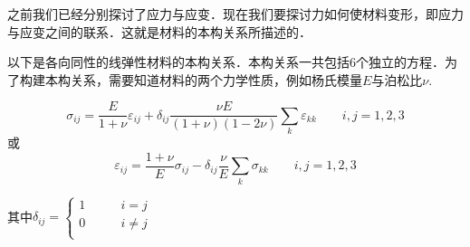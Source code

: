 
\begin{issues}
\issueDraft
\end{issues}

之前我们已经分别探讨了应力与应变．现在我们要探讨力如何使材料变形，即应力与应变之间的联系．这就是材料的本构关系所描述的．

以下是各向同性的线弹性材料的本构关系．本构关系一共包括$6$个独立的方程．为了构建本构关系，需要知道材料的两个力学性质，例如杨氏模量$E$与泊松比$\nu$.

\begin{equation}
\sigma_{ij}=\frac{E}{1+\nu}\varepsilon_{ij}+\delta_{ij}\frac{\nu E}{(1+\nu)(1-2\nu)}\sum_k\varepsilon_{kk}\qquad i,j=1,2,3
\end{equation}
或
\begin{equation}
\varepsilon_{ij}=\frac{1+\nu}{E}\sigma_{ij}-\delta_{ij}\frac{\nu}{E}\sum_k\sigma_{kk} \qquad i,j=1,2,3
\end{equation}

其中$\delta_{ij} = \left \{
\begin{aligned}
1 &\qquad i = j\\
0 &\qquad i \ne j\\
\end{aligned}
\right.
$

